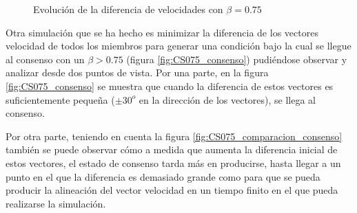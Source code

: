 \begin{figure}[htbp]
\caption{Evolución de la diferencia de velocidades con $\beta=0.75$} 
\label{fig:CS075_vel}
\end{figure}

Otra simulación que se ha hecho es minimizar la diferencia de los vectores velocidad de todos los miembros para generar una condición bajo la cual se llegue al consenso con un \linebreak $\beta > 0.75$ (figura \ref{fig:CS075_consenso}) pudiéndose observar y analizar desde dos puntos de vista. Por una parte, en la figura \ref{fig:CS075_consenso} se muestra que cuando la diferencia de estos vectores es suficientemente pequeña ($\pm 30^o$ en la dirección de los vectores), se llega al consenso. 

Por otra parte, teniendo en cuenta la figura \ref{fig:CS075_comparacion_consenso} también se puede observar cómo a medida que aumenta la diferencia inicial de estos vectores, el estado de consenso tarda más en producirse, hasta llegar a un punto en el que la diferencia es demasiado grande como para que se pueda producir la alineación del vector velocidad en un tiempo finito en el que pueda realizarse la simulación.

